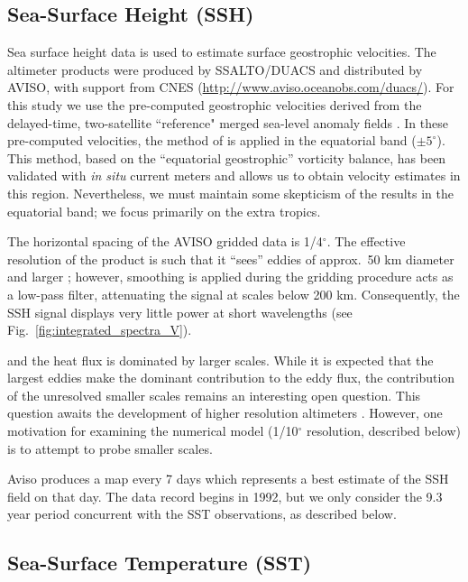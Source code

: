 \documentclass[10pt]{article}
\begin{document}
\subsection{Sea-Surface Height (SSH)}
Sea surface height data is used to estimate surface geostrophic velocities. The altimeter products were produced by SSALTO/DUACS and distributed by AVISO, with support from CNES (\url{http://www.aviso.oceanobs.com/duacs/}). For this study we use the pre-computed geostrophic velocities derived from the delayed-time, two-satellite ``reference" merged sea-level anomaly fields . In these pre-computed velocities, the method of \citet{LagerloefEtAl1999} is applied in the equatorial band ($\pm 5^\circ$). This method, based on the ``equatorial geostrophic'' vorticity balance, has been validated with {\em in situ} current meters and allows us to obtain velocity estimates in this region. Nevertheless, we must maintain some skepticism of the results in the equatorial band;  we focus primarily on the extra tropics.

The horizontal spacing of the AVISO gridded data is 1/4$^\circ$. The effective resolution of the product is such that it ``sees'' eddies of approx.~50 km diameter and larger \citep{CheltonEtAl2011}; however, smoothing is applied during the gridding procedure acts as a low-pass filter, attenuating the signal at scales below 200 km. Consequently, the SSH signal displays very little power at short wavelengths (see Fig.~\ref{fig:integrated_spectra_V}).

and the heat flux is dominated by larger scales. While it is expected that the largest eddies make the dominant contribution to the eddy flux, the contribution of the unresolved smaller scales remains an interesting open question. This question awaits the development of higher resolution altimeters \citep{FuFerrari2008}. However, one motivation for examining the numerical model (1/10$^\circ$ resolution, described below) is to attempt to probe smaller scales.

Aviso produces a map every 7 days which represents a best estimate of the SSH field on that day. The data record begins in 1992, but we only consider the 9.3 year period concurrent with the SST observations, as described below.

\subsection{Sea-Surface Temperature (SST)}
\end{document}
